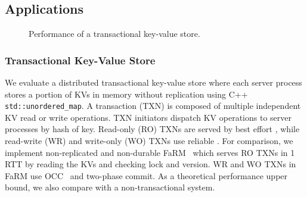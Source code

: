 \subsection{Applications}
\label{sec:application}


\begin{figure}[t]
	\centering
	\hspace{0.01\textwidth}
	\hspace{0.01\textwidth}
	\caption{Performance of a transactional key-value store.}
	\vspace{-15pt}
\end{figure}


\subsubsection{Transactional Key-Value Store}
\label{subsec:eval-kvs}


We evaluate a distributed transactional key-value store where each server process stores a portion of KVs in memory without replication using C++ \texttt{std::unordered\_map}.
A transaction (TXN) is composed of multiple independent KV read or write operations.
TXN initiators dispatch KV operations to server processes by hash of key.
Read-only (RO) TXNs are served by best effort \sys{}, while read-write (WR) and write-only (WO) TXNs use reliable \sys{}.
For comparison, we implement non-replicated and non-durable FaRM~\cite{dragojevic2014farm} which serves RO TXNs in 1 RTT by reading the KVs and checking lock and version. WR and WO TXNs in FaRM use OCC~\cite{kung1981optimistic} and two-phase commit.
As a theoretical performance upper bound, we also compare with a non-transactional system.

